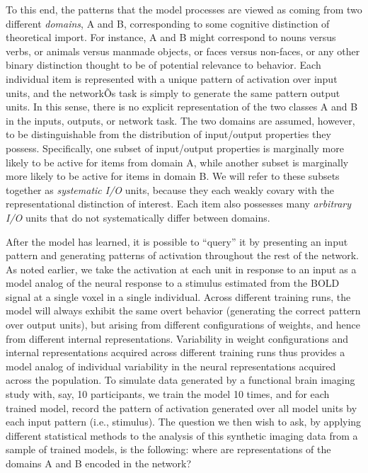 To this end, the patterns that the model processes are viewed as coming from two different {\em domains}, A and B, corresponding to some cognitive distinction of theoretical import. For instance, A and B might correspond to nouns versus verbs, or animals versus manmade objects, or faces versus non-faces, or any other binary distinction thought to be of potential relevance to behavior.  Each individual item is represented with a unique pattern of activation over input units, and the networkÕs task is simply to generate the same pattern output units. In this sense, there is no explicit representation of the two classes A and B in the inputs, outputs, or network task. The two domains are assumed, however, to be distinguishable from the distribution of input/output properties they possess. Specifically, one subset of input/output properties is marginally more likely to be active for items from domain A, while another subset is marginally more likely to be active for items in domain B. We will refer to these subsets together as {\em systematic I/O} units, because they each weakly covary with the representational distinction of interest.  Each item also possesses many {\em arbitrary I/O} units that do not systematically differ between domains.

After the model has learned, it is possible to ``query'' it by presenting an input pattern and generating patterns of activation throughout the rest of the network. As noted earlier, we take the activation at each unit in response to an input as a model analog of the neural response to a stimulus estimated from the BOLD signal at a single voxel in a single individual. Across different training runs, the model will always exhibit the same overt behavior (generating the correct pattern over output units), but arising from different configurations of weights, and hence from different internal representations. Variability in weight configurations and internal representations acquired across different training runs thus provides a model analog of individual variability in the neural representations acquired across the population. To simulate data generated by a functional brain imaging study with, say, 10 participants, we train the model 10 times, and for each trained model, record the pattern of activation generated over all model units by each input pattern (i.e., stimulus).  The question we then wish to ask, by applying different statistical methods to the analysis of this synthetic imaging data from a sample of trained models, is the following: where are representations of the domains A and B encoded in the network?

